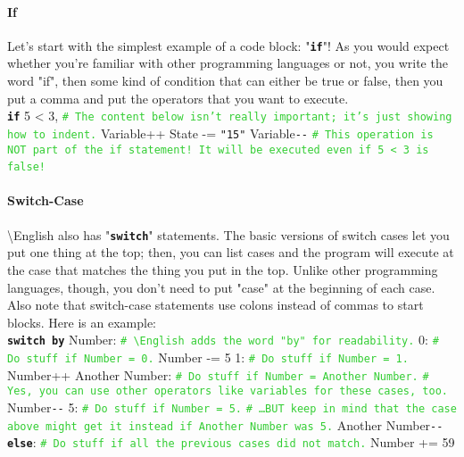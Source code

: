 \documentclass{article}
\newcommand{\English}{\textbackslash{}English}				%
\newcommand{\codecomment}[1]{\texttt{\textcolor{LimeGreen}{#1}}}
\newcommand{\commentline}[1]{\codecomment{\# #1}}
\newcommand{\common}[1]{\texttt{\textcolor{Mulberry}{\textbf{#1}}}}
\newcommand{\codestring}[1]{\texttt{\textcolor{NavyBlue}{"#1"}}}
\newenvironment{code}[0]
{\ttfamily{}				%
\setlength\parindent{0cm}	%
~\\}
{\setlength\parindent{1cm}
~\\}
\begin{document}
\paragraph{If}
\indent Let's start with the simplest example of a code block: "\common{if}"! As you would expect whether you're familiar with other programming languages or not, you write the word "if", then some kind of condition that can either be true or false, then you put a comma and put the operators that you want to execute.
\begin{code}
\common{if} 5 < 3,
\qquad{}\commentline{The content below isn't really important; it's just showing how to indent.}
\qquad{}Variable++
\qquad{}State -= \codestring{15}
Variable\verb+--+ \commentline{This operation is NOT part of the if statement! It will be executed even if 5 < 3 is false!}
\end{code}

\paragraph{Switch-Case}
\indent \English{} also has "\common{switch}" statements. The basic versions of switch cases let you put one thing at the top; then, you can list cases and the program will execute at the case that matches the thing you put in the top. Unlike other programming languages, though, you don't need to put "case" at the beginning of each case. Also note that switch-case statements use colons instead of commas to start blocks. Here is an example:
\begin{code}
\common{switch by} Number: \commentline{\English{} adds the word "by" for readability.}
0:
\qquad\commentline{Do stuff if Number = 0.}
\qquad{}Number -= 5
1:
\qquad\commentline{Do stuff if Number = 1.}
\qquad{}Number++
Another Number:
\qquad\commentline{Do stuff if Number = Another Number.}
\qquad\commentline{Yes, you can use other operators like variables for these cases, too.}
\qquad{}Number\verb+--+
5:
\qquad\commentline{Do stuff if Number = 5.}
\qquad\commentline{\ldots{}BUT keep in mind that the case above might get it instead if Another Number was 5.}
\qquad{}Another Number\verb+--+
\common{else}:
\qquad\commentline{Do stuff if all the previous cases did not match.}
\qquad{}Number += 59
\end{code}
\end{document}
